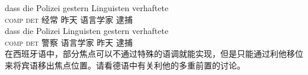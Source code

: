 
\eal
\ex 
\gll dass die Polizei gestern Linguisten verhaftete\\
	 \textsc{comp} \textsc{det} 经常 昨天 语言学家 逮捕\\
\ex 
\gll dass die Polizei Linguisten gestern verhaftete\\
	 \textsc{comp} \textsc{det} 警察 语言学家 昨天 逮捕\\
\zl
%
在西班牙语中，部分焦点可以不通过特殊的语调就能实现，但是只能通过利他移位来将宾语移出焦点位置。请看德语中有关利他的多重前置的讨论。

